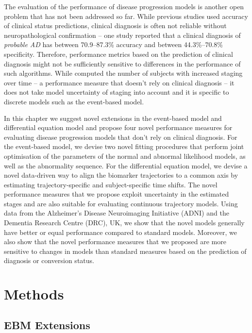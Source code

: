 The evaluation of the performance of disease progression models is another open problem that has not been addressed so far. While previous studies used accuracy of clinical status predictions\cite{young2014data}, clinical diagnosis is often not reliable without neuropathological confirmation -- one study reported that a clinical diagnosis of \emph{probable AD} has between 70.9--87.3\% accuracy and between 44.3\%--70.8\% specificity. Therefore, performance metrics based on the prediction of clinical diagnosis might not be sufficiently sensitive to differences in the performance of such algorithms. While \cite{fonteijn2012event} computed the number of subjects with increased staging over time -- a performance measure that doesn't rely on clinical diagnosis -- it does not take model uncertainty of staging into account and it is specific to discrete models such as the event-based model. 

In this chapter we suggest novel extensions in the event-based model and differential equation model and propose four novel performance measures for evaluating disease progression models that don't rely on clinical diagnosis. For the event-based model, we devise two novel fitting procedures that perform joint optimisation of the parameters of the normal and abnormal likelihood models, as well as the abnormality sequence. For the differential equation model, we devise a novel data-driven way to align the biomarker trajectories to a common axis by estimating trajectory-specific and subject-specific time shifts. The novel performance measures that we propose exploit uncertainty in the estimated stages and are also suitable for evaluating continuous trajectory models. Using data from the Alzheimer's Disease Neuroimaging Initiative (ADNI) and the Dementia Research Centre (DRC), UK, we show that the novel models generally have better or equal performance compared to standard models. Moreover, we also show that the novel performance measures that we proposed are more sensitive to changes in models than standard measures based on the prediction of diagnosis or conversion status. 

\section{Methods}

\subsection{EBM Extensions}

